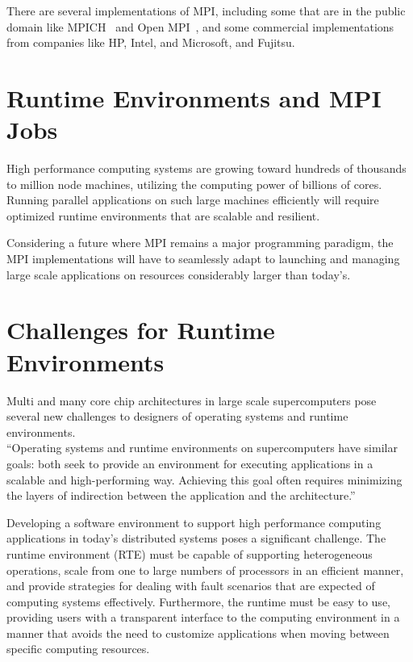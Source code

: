 There are several implementations of MPI, including some that are in the public domain like MPICH~\cite{gropp2002mpich2} and Open MPI~\cite{gabriel04:_open_mpi}, and some commercial implementations from companies like HP, Intel, and Microsoft, and Fujitsu.


\section{Runtime Environments and MPI Jobs}
High performance computing systems are growing toward hundreds of thousands to million node machines, utilizing the computing power of billions of cores. Running parallel applications on such large machines efficiently will require optimized runtime environments that are scalable and resilient.

Considering a future where MPI remains a major programming paradigm, the MPI implementations will have to seamlessly adapt to launching and managing large scale applications on resources considerably larger than today's.~\cite{bosilca2011scalability}

\section{Challenges for Runtime Environments}
Multi and many core chip architectures in large scale supercomputers pose several new challenges to designers of operating systems and runtime environments.\\
``Operating systems and runtime environments on supercomputers have similar goals: both seek to provide an environment for executing applications in a scalable and high-performing way. Achieving this goal often requires minimizing the layers of indirection between the application and the architecture.''~\cite{Hoefler:2012:OSR:2237840.2237848}

Developing a software environment to support high performance computing applications in today's distributed systems poses a significant challenge. The runtime environment (RTE) must be capable of supporting heterogeneous operations, scale from one to large numbers of processors in an efficient manner, and provide strategies for dealing with fault scenarios that are expected of computing systems effectively. Furthermore, the runtime must be easy to use, providing users with a transparent interface to the computing environment in a manner that avoids the need to customize applications when moving between specific computing resources.~\cite{Castain2008153}

